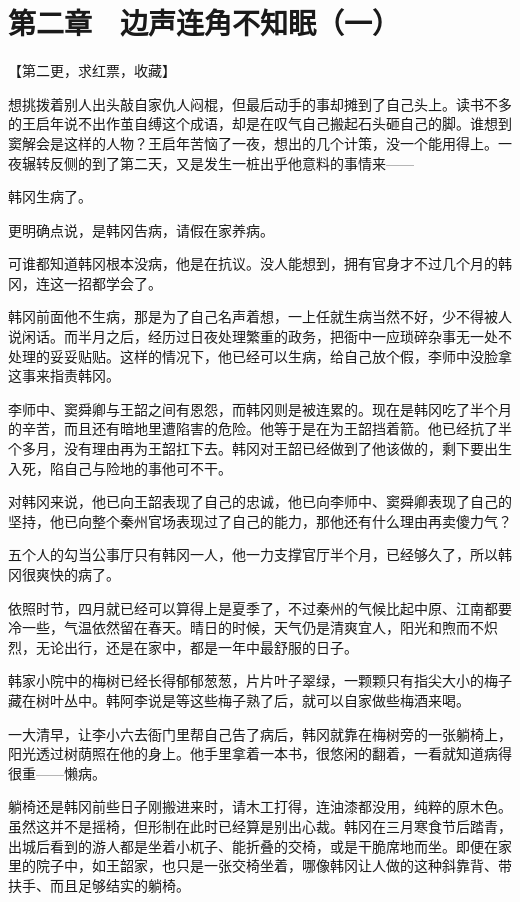 \section{第二章　边声连角不知眠（一）}

【第二更，求红票，收藏】

想挑拨着别人出头敲自家仇人闷棍，但最后动手的事却摊到了自己头上。读书不多的王启年说不出作茧自缚这个成语，却是在叹气自己搬起石头砸自己的脚。谁想到窦解会是这样的人物？王启年苦恼了一夜，想出的几个计策，没一个能用得上。一夜辗转反侧的到了第二天，又是发生一桩出乎他意料的事情来——

韩冈生病了。

更明确点说，是韩冈告病，请假在家养病。

可谁都知道韩冈根本没病，他是在抗议。没人能想到，拥有官身才不过几个月的韩冈，连这一招都学会了。

韩冈前面他不生病，那是为了自己名声着想，一上任就生病当然不好，少不得被人说闲话。而半月之后，经历过日夜处理繁重的政务，把衙中一应琐碎杂事无一处不处理的妥妥贴贴。这样的情况下，他已经可以生病，给自己放个假，李师中没脸拿这事来指责韩冈。

李师中、窦舜卿与王韶之间有恩怨，而韩冈则是被连累的。现在是韩冈吃了半个月的辛苦，而且还有暗地里遭陷害的危险。他等于是在为王韶挡着箭。他已经抗了半个多月，没有理由再为王韶扛下去。韩冈对王韶已经做到了他该做的，剩下要出生入死，陷自己与险地的事他可不干。

对韩冈来说，他已向王韶表现了自己的忠诚，他已向李师中、窦舜卿表现了自己的坚持，他已向整个秦州官场表现过了自己的能力，那他还有什么理由再卖傻力气？

五个人的勾当公事厅只有韩冈一人，他一力支撑官厅半个月，已经够久了，所以韩冈很爽快的病了。

依照时节，四月就已经可以算得上是夏季了，不过秦州的气候比起中原、江南都要冷一些，气温依然留在春天。晴日的时候，天气仍是清爽宜人，阳光和煦而不炽烈，无论出行，还是在家中，都是一年中最舒服的日子。

韩家小院中的梅树已经长得郁郁葱葱，片片叶子翠绿，一颗颗只有指尖大小的梅子藏在树叶丛中。韩阿李说是等这些梅子熟了后，就可以自家做些梅酒来喝。

一大清早，让李小六去衙门里帮自己告了病后，韩冈就靠在梅树旁的一张躺椅上，阳光透过树荫照在他的身上。他手里拿着一本书，很悠闲的翻着，一看就知道病得很重——懒病。

躺椅还是韩冈前些日子刚搬进来时，请木工打得，连油漆都没用，纯粹的原木色。虽然这并不是摇椅，但形制在此时已经算是别出心裁。韩冈在三月寒食节后踏青，出城后看到的游人都是坐着小杌子、能折叠的交椅，或是干脆席地而坐。即便在家里的院子中，如王韶家，也只是一张交椅坐着，哪像韩冈让人做的这种斜靠背、带扶手、而且足够结实的躺椅。

